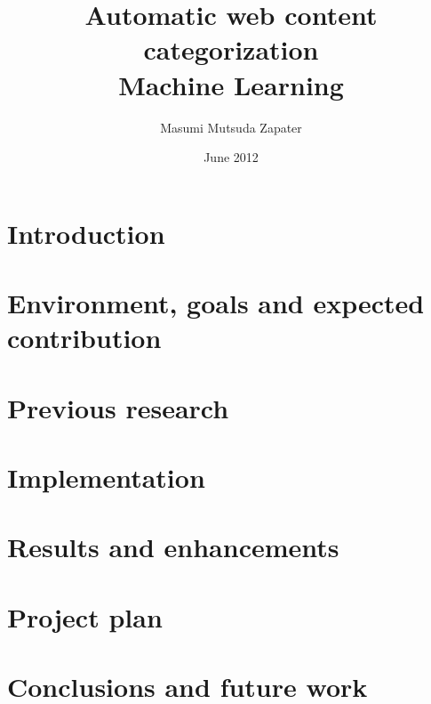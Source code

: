 \documentclass[12pt, a4paper , titlepage]{report}
\author{Masumi Mutsuda Zapater}
\title{Automatic web content categorization \\ Machine Learning}
\date{June 2012}
\begin{document}
\maketitle



\tableofcontents


\chapter{Introduction}


\chapter[Environment and goals]{Environment, goals and expected contribution}
\label{chap:flowsight}


\chapter{Previous research}
\label{chap:research}


\chapter{Implementation}
\label{chap:implementation}


\chapter[Results \& enhancements]{Results and enhancements}
\label{chap:enhancements}


\chapter{Project plan}
\label{chap:plan}



\chapter[Conclusions]{Conclusions and future work}
\label{chap:conclusions}


\cleardoublepage
{}
{}


\cleardoublepage
{}
{} 
\listoffigures
\end{document}

